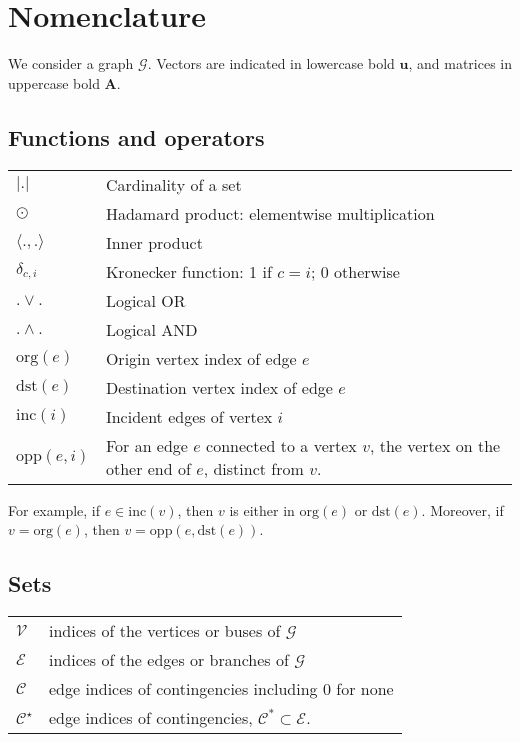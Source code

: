 \section*{Nomenclature}
\label{ss:Formulation}

\noindent
We consider a graph $\mathcal{G}$.
Vectors  are indicated in lowercase bold  $\pmb{u}$, and matrices  in uppercase bold $\pmb{A}$. 

\subsection*{Functions and operators}

\noindent
\begin{tabular}{p{1.5cm}p{6.5cm}}
    $|.|$              & Cardinality of a set                         \\
    $\odot$            & Hadamard product: elementwise multiplication \\
    $\langle .,.\rangle$ & Inner product                               \\
    $\delta_{c,i}$     & Kronecker function: 1 if $c=i$; 0 otherwise       \\
    $.\vee.$           & Logical OR                                   \\
    $.\wedge.$         & Logical AND                                  \\
    $\text{org}(e)$    & Origin vertex index of edge $e$              \\
    $\text{dst}(e)$    & Destination vertex index of edge $e$         \\
    $\text{inc}(i)$    & Incident edges of vertex $i$\\
    $\text{opp}(e,i)$  & For an edge $e$ connected to a vertex $v$, the vertex on the other end of $e$, distinct from $v$.
\end{tabular}
For example, if $e \in \text{inc}(v)$, then $v$ is either in $\text{org}(e)$ or $\text{dst}(e)$. Moreover, if $v=\text{org}(e)$, then $v = \text{opp}(e, \text{dst}(e))$.

\subsection*{Sets}

\noindent
\begin{tabular}{p{1.5cm}p{6.5cm}}
    $\mathcal{V}$         & indices of the vertices or buses of $\mathcal{G}$    \\
    $\mathcal{E}$         & indices of the edges or branches of $\mathcal{G}$    \\
    $\mathcal{C}$         & edge indices of contingencies including $0$ for none \\
    $\mathcal{C}^{\star}$ & edge indices of contingencies, $\mathcal{C}^{*}\subset \mathcal{E}$.
\end{tabular}


